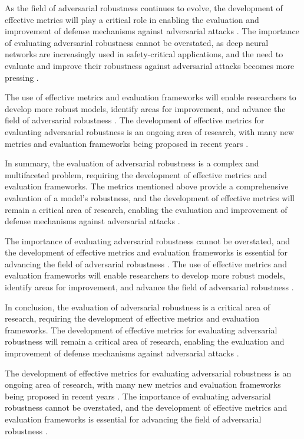 \documentclass[11pt]{article}
\begin{document}
As the field of adversarial robustness continues to evolve, the development of effective metrics will play a critical role in enabling the evaluation and improvement of defense mechanisms against adversarial attacks \cite{ref176}. The importance of evaluating adversarial robustness cannot be overstated, as deep neural networks are increasingly used in safety-critical applications, and the need to evaluate and improve their robustness against adversarial attacks becomes more pressing \cite{ref162}.

The use of effective metrics and evaluation frameworks will enable researchers to develop more robust models, identify areas for improvement, and advance the field of adversarial robustness \cite{ref171}. The development of effective metrics for evaluating adversarial robustness is an ongoing area of research, with many new metrics and evaluation frameworks being proposed in recent years \cite{ref144}.

In summary, the evaluation of adversarial robustness is a complex and multifaceted problem, requiring the development of effective metrics and evaluation frameworks. The metrics mentioned above provide a comprehensive evaluation of a model's robustness, and the development of effective metrics will remain a critical area of research, enabling the evaluation and improvement of defense mechanisms against adversarial attacks \cite{ref177}.

The importance of evaluating adversarial robustness cannot be overstated, and the development of effective metrics and evaluation frameworks is essential for advancing the field of adversarial robustness \cite{ref178}. The use of effective metrics and evaluation frameworks will enable researchers to develop more robust models, identify areas for improvement, and advance the field of adversarial robustness \cite{ref179}.

In conclusion, the evaluation of adversarial robustness is a critical area of research, requiring the development of effective metrics and evaluation frameworks. The development of effective metrics for evaluating adversarial robustness will remain a critical area of research, enabling the evaluation and improvement of defense mechanisms against adversarial attacks \cite{ref180}.

The development of effective metrics for evaluating adversarial robustness is an ongoing area of research, with many new metrics and evaluation frameworks being proposed in recent years \cite{ref145}. The importance of evaluating adversarial robustness cannot be overstated, and the development of effective metrics and evaluation frameworks is essential for advancing the field of adversarial robustness \cite{ref181}.
\end{document}
